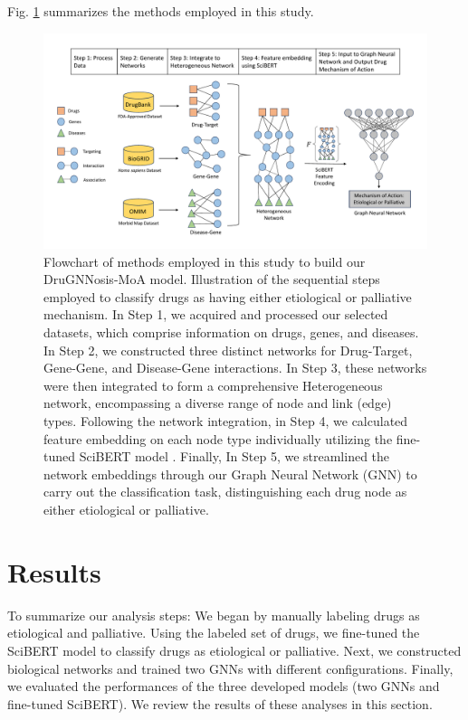 \documentclass[journal,twoside,web]{ieeecolor}
\begin{document}
Fig. \ref{fig:FlowChart} summarizes the methods employed in this study.
\vspace{-3.5em}
\begin{figure}[H]
    \centering
    \includegraphics[width=\linewidth]{Figures/FlowChart.pdf}
    \caption{Flowchart of methods employed in this study to build our DruGNNosis-MoA model.
            Illustration of the sequential steps employed to classify drugs as having either etiological or palliative mechanism.
            In Step 1, we acquired and processed our selected datasets, which comprise information on drugs, genes, and diseases.
            In Step 2, we constructed three distinct networks for Drug-Target, Gene-Gene, and Disease-Gene interactions.
            In Step 3, these networks were then integrated to form a comprehensive Heterogeneous network, encompassing a diverse range of node and link (edge) types.
            Following the network integration, in Step 4, we calculated feature embedding on each node type individually utilizing the fine-tuned SciBERT model \cite{beltagy2019scibert}.
            Finally, In Step 5, we streamlined the network embeddings through our Graph Neural Network (GNN) to carry out the classification task, distinguishing each drug node as either etiological or palliative.}
    \label{fig:FlowChart}
\end{figure}

\section{Results}
\label{sec:res}
To summarize our analysis steps: We began by manually labeling drugs as etiological and palliative.
Using the labeled set of drugs, we fine-tuned the SciBERT model to classify drugs as etiological or palliative.
Next, we constructed biological networks and trained two GNNs with different configurations.
Finally, we evaluated the performances of the three developed models (two GNNs and fine-tuned SciBERT). We review the results of these analyses in this section.
\end{document}
